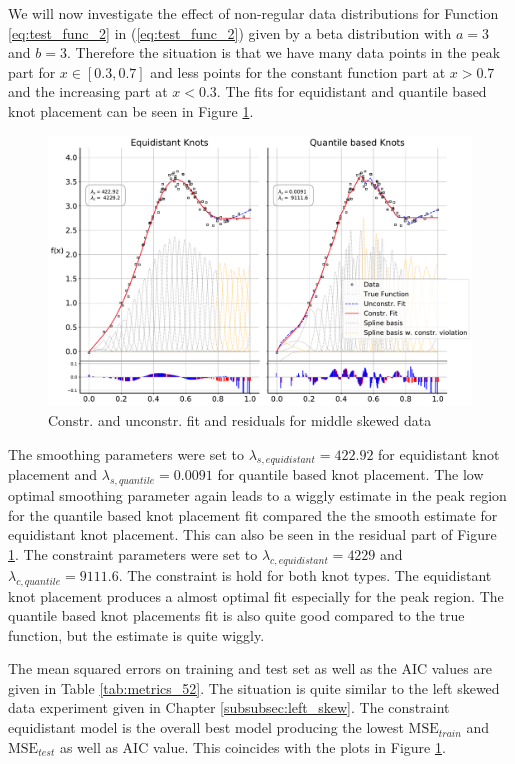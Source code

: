 \documentclass[10pt,a4paper]{article}
\begin{document}
We will now investigate the effect of non-regular data distributions for Function \ref{eq:test_func_2} in (\ref{eq:test_func_2}) given by a beta distribution with $a = 3$ and $b = 3$. Therefore the situation is that we have many data points in the peak part for $x \in [0.3, 0.7]$ and less points for the constant function part at $x > 0.7$ and the increasing part at $x < 0.3$. The fits for equidistant and quantile based knot placement can be seen in Figure \ref{fig:fit_middle_skew_250}. 

\begin{figure}[H]
	\centering
	\includegraphics[width=\columnwidth]{../thesisplots/exp_beta/exp_middle_skewed_data_ndata_250_rseed_1.pdf}
	\caption{Constr. and unconstr. fit and residuals for middle skewed data}
	\label{fig:fit_middle_skew_250}
\end{figure}

The smoothing parameters were set to $\lambda_{s, equidistant} = 422.92$ for equidistant knot placement and $\lambda_{s, quantile} = 0.0091$ for quantile based knot placement. The low optimal smoothing parameter again leads to a wiggly estimate in the peak region for the quantile based knot placement fit compared the the smooth estimate for equidistant knot placement. This can also be seen in the residual part of Figure \ref{fig:fit_middle_skew_250}. The constraint parameters were set to $\lambda_{c, equidistant} = 4229$ and $\lambda_{c, quantile} = 9111.6$. The constraint is hold for both knot types. The equidistant knot placement produces a almost optimal fit especially for the peak region. The quantile based knot placements fit is also quite good compared to the true function, but the estimate is quite wiggly.

The mean squared errors on training and test set as well as the AIC values are given in Table \ref{tab:metrics_52}. The situation is quite similar to the left skewed data experiment given in Chapter \ref{subsubsec:left_skew}. The constraint equidistant model is the overall best model producing the lowest $\text{MSE}_{train}$ and $\text{MSE}_{test}$ as well as AIC value. This coincides with the plots in Figure \ref{fig:fit_middle_skew_250}. 
\end{document}
